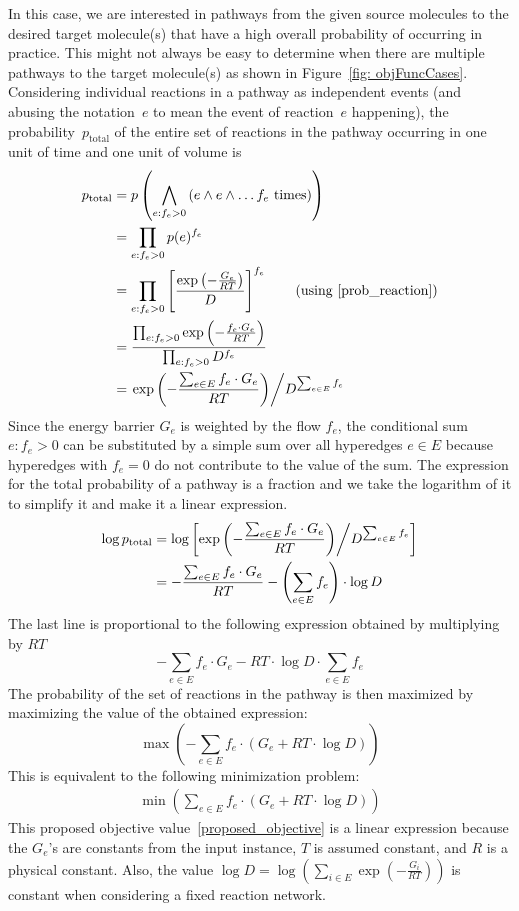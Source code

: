 In this case, we are interested in pathways from the given source molecules to the desired target molecule(s) that have a high overall probability of occurring in practice. This might not always be easy to determine when there are multiple pathways to the target molecule(s) as shown in Figure~\ref{fig: objFuncCases}. Considering individual reactions in a pathway as independent events (and abusing the notation~$e$ to mean the event of reaction~$e$ happening), the probability~$p_{\text{total}}$ of the entire set of reactions in the pathway occurring in one unit of time and one unit of volume is
\begin{align*}
    p_{\text{total}} &= p\left( \bigwedge_{e: f_e > 0} \left(e\wedge e \wedge \ldots f_e\text{ times}\right)\right) \\
    &= \prod_{e: f_e > 0} p(e)^{f_e} \\
    &= \prod_{e: f_e > 0} \left[\frac{\exp\left(-\frac{G_e}{RT}\right)}{D}\right]^{f_e} \tag{\text{using }\ref{prob_reaction}} \\
    &= \frac{\prod_{e: f_e > 0} \exp\left(-\frac{f_e\cdot G_e}{RT}\right)}{\prod_{e: f_e > 0} D^{f_e}} \\
    &= \left.\exp\left(-\frac{\sum_{e \in E} f_e\cdot G_e}{RT} \right) \middle/ D^{\sum_{e \in E} f_e}\right.
\end{align*}
Since the energy barrier $G_e$ is weighted by the flow $f_e$, the conditional sum $e: f_e > 0$ can be substituted by a simple sum over all hyperedges $e\in E$ because hyperedges with $f_e = 0$ do not contribute to the value of the sum.
The expression for the total probability of a pathway is a fraction and we take the logarithm of it to simplify it and make it a linear expression.
\begin{align*}
    \log p_{\text{total}} &= \log \left[\exp\left(-\frac{\sum_{e \in E} f_e\cdot G_e}{RT} \right) \middle/ D^{\sum_{e \in E} f_e}\right] \\
    &= -\frac{\sum_{e \in E} f_e\cdot G_e}{RT} - \left(\sum_{e \in E} f_e\right) \cdot \log D 
\end{align*}
The last line is proportional to the following expression obtained by multiplying by $RT$
\begin{equation*}
    -\sum_{e \in E} f_e\cdot G_e - RT\cdot \log D\cdot \sum_{e \in E} f_e
\end{equation*}
The probability of the set of reactions in the pathway is then maximized by maximizing the value of the obtained expression:
\begin{equation*}
    \max\left(-\sum_{e \in E} f_e\cdot \left(G_e + RT\cdot \log D \right)\right)
\end{equation*}
This is equivalent to the following minimization problem:
\begin{align}
    \min\left(\sum_{e \in E} f_e\cdot \left(G_e + RT\cdot \log D \right)\right) \label{proposed_objective}
\end{align}
This proposed objective value~\eqref{proposed_objective} is a linear expression because the $G_e$'s are constants from the input instance, $T$ is assumed constant, and $R$ is a physical constant. Also, the value $\log D = \log \left(\sum_{i\in E} \exp\left(-\frac{G_i}{RT}\right)\right)$ is constant when considering a fixed reaction network.

